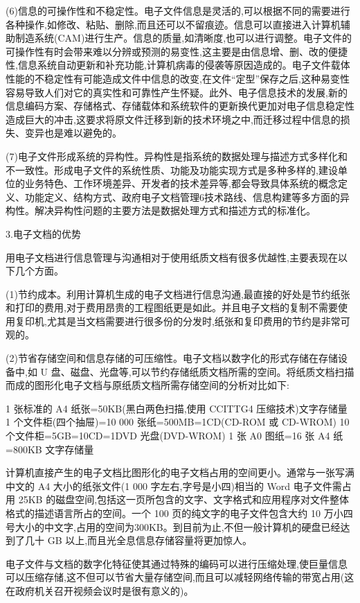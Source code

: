     (6)信息的可操作性和不稳定性。电子文件信息是灵活的,可以根据不同的需要进行各种操作,如修改、粘贴、删除,而且还可以不留痕迹。信息可以直接进入计算机辅助制造系统(CAM)进行生产。信息的质量,如清晰度,也可以进行调整。电子文件的可操作性有时会带来难以分辨或预测的易变性,这主要是由信息增、删、改的便捷性,信息系统自动更新和补充功能,计算机病毒的侵袭等原因造成的。电子文件载体性能的不稳定性有可能造成文件中信息的改变,在文件“定型”保存之后,这种易变性容易导致人们对它的真实性和可靠性产生怀疑。此外、电子信息技术的发展,新的信息编码方案、存储格式、存储载体和系统软件的更新换代更加对电子信息稳定性造成巨大的冲击,这要求将原文件迁移到新的技术环境之中,而迁移过程中信息的损失、变异也是难以避免的。

    (7)电子文件形成系统的异构性。异构性是指系统的数据处理与描述方式多样化和不一致性。形成电子文件的系统性质、功能及功能实现方式是多种多样的,建设单位的业务特色、工作环境差异、开发者的技术差异等,都会导致具体系统的概念定义、功能定义、结构方式、政府电子文档管理6技术路线、信息构建等多方面的异构性。解决异构性问题的主要方法是数据处理方式和描述方式的标准化。

    3.电子文档的优势

    用电子文档进行信息管理与沟通相对于使用纸质文档有很多优越性,主要表现在以下几个方面。

    (1)节约成本。利用计算机生成的电子文档进行信息沟通,最直接的好处是节约纸张和打印的费用,对于费用昂贵的工程图纸更是如此。并且电子文档的复制不需要使用复印机,尤其是当文档需要进行很多份的分发时,纸张和复印费用的节约是非常可观的。

    (2)节省存储空间和信息存储的可压缩性。电子文档以数字化的形式存储在存储设备中,如 U 盘、磁盘、光盘等,可以节约存储纸质文档所需的空间。将纸质文档扫描而成的图形化电子文档与原纸质文档所需存储空间的分析对比如下:

    1 张标准的 A4 纸张=50KB(黑白两色扫描,使用 CCITTG4 压缩技术)文字存储量
    1 个文件柜(四个抽屉)=10 000 张纸=500MB=1CD(CD-ROM 或 CD-WROM)
    10 个文件柜=5GB=10CD=1DVD 光盘(DVD-WROM)
    1 张 A0 图纸=16 张 A4 纸=800KB 文字存储量

    计算机直接产生的电子文档比图形化的电子文档占用的空间更小。通常与一张写满中文的 A4 大小的纸张文件(1 000 字左右,字号是小四)相当的 Word 电子文件需占用 25KB 的磁盘空间,包括这一页所包含的文字、文字格式和应用程序对文件整体格式的描述语言所占的空间。一个 100 页的纯文字的电子文件包含大约 10 万小四号大小的中文字,占用的空间为300KB。到目前为止,不但一般计算机的硬盘已经达到了几十 GB 以上,而且光全息信息存储容量将更加惊人。

    电子文件与文档的数字化特征使其通过特殊的编码可以进行压缩处理,使巨量信息可以压缩存储,这不但可以节省大量存储空间,而且可以减轻网络传输的带宽占用(这在政府机关召开视频会议时是很有意义的)。


